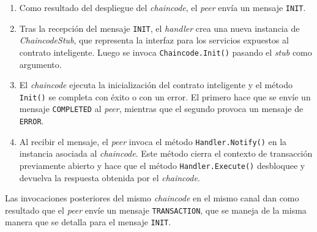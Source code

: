 \begin{enumerate}
\item Como resultado del despliegue del \textit{chaincode}, el \textit{peer} envía un mensaje \texttt{INIT}. 


\item Tras la recepción del mensaje \texttt{INIT}, el \textit{handler} crea una nueva instancia de \textit{ChaincodeStub}, que representa la interfaz para los servicios expuestos al contrato inteligente. Luego se invoca \texttt{Chaincode.Init()} pasando el \textit{stub} como argumento.

\item El \textit{chaincode} ejecuta la inicialización del contrato inteligente y el método \texttt{Init()} se completa con éxito o con un error. El primero hace que se envíe un mensaje \texttt{COMPLETED} al \textit{peer}, mientras que el segundo provoca un mensaje de \texttt{ERROR}.

\item Al recibir el mensaje, el \textit{peer} invoca el método \texttt{Handler.Notify()} en la instancia asociada al \textit{chaincode}. Este método cierra el contexto de transacción previamente abierto y hace que el método \texttt{Handler.Execute()} desbloquee y devuelva la respuesta obtenida por el \textit{chaincode}.

\end{enumerate}

Las invocaciones posteriores del mismo \textit{chaincode} en el mismo canal dan como resultado que el \textit{peer} envíe un mensaje \texttt{TRANSACTION}, que se maneja de la misma manera que se detalla para el mensaje \texttt{INIT}.






